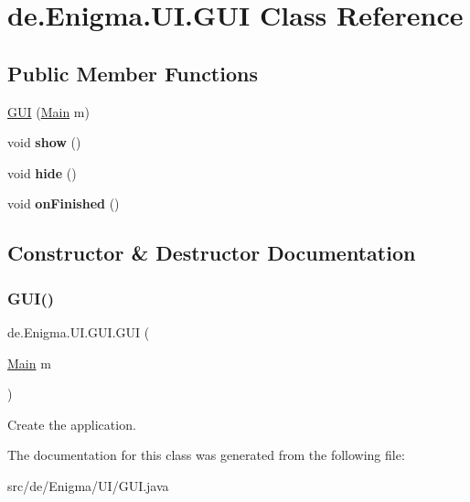 \hypertarget{classde_1_1_enigma_1_1_u_i_1_1_g_u_i}{}\section{de.\+Enigma.\+U\+I.\+G\+UI Class Reference}
\label{classde_1_1_enigma_1_1_u_i_1_1_g_u_i}
\subsection*{Public Member Functions}
\begin{DoxyCompactItemize}
\item 
\hyperlink{classde_1_1_enigma_1_1_u_i_1_1_g_u_i_ac98b39fcda7d523f32565a14ca1b8487}{G\+UI} (\hyperlink{classde_1_1_enigma_1_1_core_1_1_main}{Main} m)
\item 
\mbox{\label{classde_1_1_enigma_1_1_u_i_1_1_g_u_i_af18e71a09d8ddb27e1a509e71ca3907f}} 
void {\bfseries show} ()
\item 
\mbox{\label{classde_1_1_enigma_1_1_u_i_1_1_g_u_i_a34b0741a65eb5dd157afeb9ecdc17252}} 
void {\bfseries hide} ()
\item 
\mbox{\label{classde_1_1_enigma_1_1_u_i_1_1_g_u_i_a298bbca8a9e094757b7443530b181c37}} 
void {\bfseries on\+Finished} ()
\end{DoxyCompactItemize}


\subsection{Constructor \& Destructor Documentation}
\mbox{\label{classde_1_1_enigma_1_1_u_i_1_1_g_u_i_ac98b39fcda7d523f32565a14ca1b8487}} 
\subsubsection{\texorpdfstring{G\+U\+I()}{GUI()}}
{\footnotesize\ttfamily de.\+Enigma.\+U\+I.\+G\+U\+I.\+G\+UI (\begin{DoxyParamCaption}\item[{\hyperlink{classde_1_1_enigma_1_1_core_1_1_main}{Main}}]{m }\end{DoxyParamCaption})}

Create the application. 

The documentation for this class was generated from the following file\+:\begin{DoxyCompactItemize}
\item 
src/de/\+Enigma/\+U\+I/G\+U\+I.\+java\end{DoxyCompactItemize}
